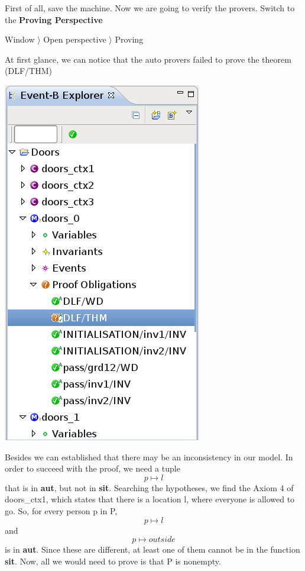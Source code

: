 First of all, save the machine. Now we are going to verify the provers. 
Switch to the \textbf{Proving Perspective}

\textsf{ Window $\rangle$ Open perspective $\rangle$ Proving }

At first glance, we can notice that the auto provers failed to prove the theorem (\textsf{DLF/THM})
\begin{center}
	\includegraphics[]{img/tutorial/tut_10_proversfailed.png}
\end{center}

Besides we can established that there may be an inconsistency in our model.
In order to succeed with the proof, we need a tuple \[ p \mapsto l \]that is in \textbf{aut}, but not in \textbf{sit}. Searching the hypotheses, we find the Axiom 4 of doors\_ctx1, which states that there is a location l, where everyone is allowed to go. So, for every person p in P, \[p \mapsto l \] and \[p \mapsto outside\] is in \textbf{aut}. Since these are different, at least one of them cannot be in the function \textbf{sit}. Now, all we would need to prove is that P is nonempty. 

